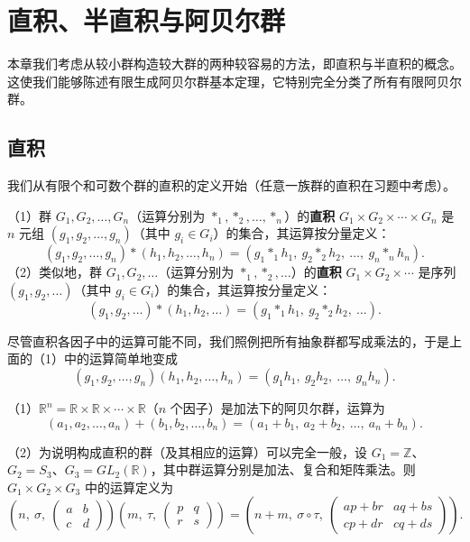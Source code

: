 

\setcounter{chapter}{4}

\chapter{直积、半直积与阿贝尔群}

本章我们考虑从较小群构造较大群的两种较容易的方法，即直积与半直积的概念。这使我们能够陈述有限生成阿贝尔群基本定理，它特别完全分类了所有有限阿贝尔群。

\section{直积}

我们从有限个和可数个群的直积的定义开始（任意一族群的直积在习题中考虑）。

\begin{definition}
（1）群 \(G_1, G_2, \ldots, G_n\)（运算分别为 \(*_1, *_2, \ldots, *_n\)）的\textbf{直积} \(G_1 \times G_2 \times \cdots \times G_n\) 是 \(n\) 元组 \((g_1, g_2, \ldots, g_n)\)（其中 \(g_i \in G_i\)）的集合，其运算按分量定义：
\[
(g_1, g_2, \ldots, g_n) * (h_1, h_2, \ldots, h_n) = (g_1 *_1 h_1,\ g_2 *_2 h_2,\ \ldots,\ g_n *_n h_n).
\]
（2）类似地，群 \(G_1, G_2, \ldots\)（运算分别为 \(*_1, *_2, \ldots\)）的\textbf{直积} \(G_1 \times G_2 \times \cdots\) 是序列 \((g_1, g_2, \ldots)\)（其中 \(g_i \in G_i\)）的集合，其运算按分量定义：
\[
(g_1, g_2, \ldots) * (h_1, h_2, \ldots) = (g_1 *_1 h_1,\ g_2 *_2 h_2,\ \ldots).
\]
\end{definition}

尽管直积各因子中的运算可能不同，我们照例把所有抽象群都写成乘法的，于是上面的（1）中的运算简单地变成
\[
(g_1, g_2, \ldots, g_n)(h_1, h_2, \ldots, h_n) = (g_1h_1,\ g_2h_2,\ \ldots,\ g_nh_n).
\]

\begin{example}
（1）\(\mathbb{R}^n = \mathbb{R} \times \mathbb{R} \times \cdots \times \mathbb{R}\)（\(n\) 个因子）是加法下的阿贝尔群，运算为
\[
(a_1, a_2, \ldots, a_n) + (b_1, b_2, \ldots, b_n) = (a_1 + b_1,\ a_2 + b_2,\ \ldots,\ a_n + b_n).
\]

（2）为说明构成直积的群（及其相应的运算）可以完全一般，设 \(G_1 = \mathbb{Z}\)、\(G_2 = S_3\)、\(G_3 = GL_2(\mathbb{R})\)，其中群运算分别是加法、复合和矩阵乘法。则 \(G_1 \times G_2 \times G_3\) 中的运算定义为
\[
\left(n,\ \sigma,\ \begin{pmatrix} a & b \\ c & d \end{pmatrix}\right)\left(m,\ \tau,\ \begin{pmatrix} p & q \\ r & s \end{pmatrix}\right) = \left(n+m,\ \sigma \circ \tau,\ \begin{pmatrix} ap+br & aq+bs \\ cp+dr & cq+ds \end{pmatrix}\right).
\]
\end{example}

